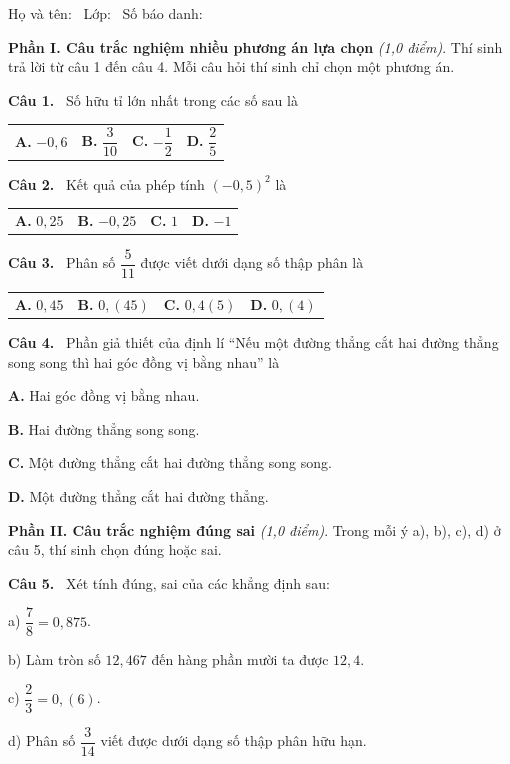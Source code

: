 \documentclass[12pt,a4paper]{article}
\makeatletter
\newcommand{\bonpa}[4]{\par\noindent\begin{tabularx}{\linewidth}{@{\hspace{0.6cm}}XXXX@{}}
\textbf{A.} #1 & \textbf{B.} #2 & \textbf{C.} #3 & \textbf{D.} #4\end{tabularx}\par}
\newcommand{\motpa}[4]{\par\hspace*{0.6cm}\textbf{A.} #1\par\hspace*{0.6cm}\textbf{B.} #2\par
\hspace*{0.6cm}\textbf{C.} #3\par\hspace*{0.6cm}\textbf{D.} #4\par}
\newcommand{\cau}[1]{\par\medskip\textbf{Câu #1.}~}
\newcommand{\y}[1]{\par\hspace*{0.6cm}#1}
\newcommand{\phan}[1]{\par\bigskip{\large\textbf{#1}}\par\smallskip}
\makeatother
\begin{document}
\medskip
Họ và tên: \dotfill\ Lớp: \makebox[2cm]{\dotfill}\ Số báo danh: \makebox[2.5cm]{\dotfill}
\phan{A. TRẮC NGHIỆM (3,0 điểm)}
\textbf{Phần I. Câu trắc nghiệm nhiều phương án lựa chọn} \textit{(1,0 điểm)}. Thí sinh trả lời từ câu 1 đến câu 4. Mỗi câu hỏi thí sinh chỉ chọn một phương án.
\cau{1} Số hữu tỉ lớn nhất trong các số sau là
\bonpa{$-0{,}6$}{$\dfrac{3}{10}$}{$-\dfrac{1}{2}$}{$\dfrac{2}{5}$}
\cau{2} Kết quả của phép tính $(-0{,}5)^{2}$ là
\bonpa{$0{,}25$}{$-0{,}25$}{$1$}{$-1$}
\cau{3} Phân số $\dfrac{5}{11}$ được viết dưới dạng số thập phân là
\bonpa{$0{,}45$}{$0{,}(45)$}{$0{,}4(5)$}{$0{,}(4)$}
\cau{4} Phần giả thiết của định lí “Nếu một đường thẳng cắt hai đường thẳng song song thì hai góc đồng vị bằng nhau” là
\motpa{Hai góc đồng vị bằng nhau.}{Hai đường thẳng song song.}{Một đường thẳng cắt hai đường thẳng song song.}{Một đường thẳng cắt hai đường thẳng.}

\medskip\textbf{Phần II. Câu trắc nghiệm đúng sai} \textit{(1,0 điểm)}. Trong mỗi ý a), b), c), d) ở câu 5, thí sinh chọn đúng hoặc sai.
\cau{5} Xét tính đúng, sai của các khẳng định sau:
\y{a) $\dfrac{7}{8}=0{,}875$.}
\y{b) Làm tròn số $12{,}467$ đến hàng phần mười ta được $12{,}4$.}
\y{c) $\dfrac{2}{3}=0{,}(6)$.}
\y{d) Phân số $\dfrac{3}{14}$ viết được dưới dạng số thập phân hữu hạn.}
\end{document}
